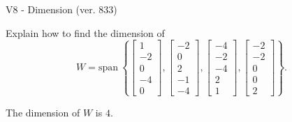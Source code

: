 \begin{exercise}
  \begin{exerciseTitle}V8 - Dimension (ver. 833)\end{exerciseTitle}
  \begin{exerciseStatement}
    Explain how to find the dimension of 
\[W=\mathrm{span}\ \left\{\left[\begin{array}{r}
1 \\
-2 \\
0 \\
-4 \\
0
\end{array}\right] , \left[\begin{array}{r}
-2 \\
0 \\
2 \\
-1 \\
-4
\end{array}\right] , \left[\begin{array}{r}
-4 \\
-2 \\
-4 \\
2 \\
1
\end{array}\right] , \left[\begin{array}{r}
-2 \\
-2 \\
0 \\
0 \\
2
\end{array}\right]\right\}.\]



  \end{exerciseStatement}
  \begin{exerciseAnswer}
   The dimension of \(W\) is  \(4\).
  


  \end{exerciseAnswer}
\end{exercise}
